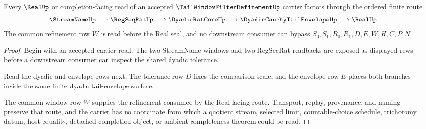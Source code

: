 \begin{theorem}
\label{thm:tail-window-filter-refinement-real-seal-route}
Every $\RealUp$ or completion-facing read of an accepted $\TailWindowFilterRefinementUp$ carrier factors through the ordered finite route
$$
\StreamNameUp \longrightarrow \RegSeqRatUp \longrightarrow \DyadicRatCoreUp \longrightarrow \DyadicCauchyTailEnvelopeUp \longrightarrow \RealUp .
$$
The common refinement row $W$ is read before the Real seal, and no downstream consumer can bypass $S_0,S_1,R_0,R_1,D,E,W,H,C,P,N$.
\end{theorem}
\begin{proof}
Begin with an accepted carrier read. The two StreamName windows and two RegSeqRat readbacks are exposed as displayed rows before a downstream consumer can inspect the shared dyadic tolerance.

Read the dyadic and envelope rows next. The tolerance row $D$ fixes the comparison scale, and the envelope row $E$ places both branches inside the same finite dyadic tail-envelope surface.

The common window row $W$ supplies the refinement consumed by the Real-facing route. Transport, replay, provenance, and naming preserve that route, and the carrier has no coordinate from which a quotient stream, selected limit, countable-choice schedule, trichotomy datum, host equality, detached completion object, or ambient completeness theorem could be read.
\end{proof}




